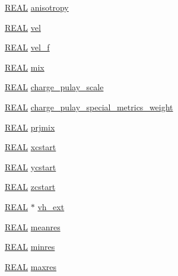 \begin{DoxyCompactItemize}
\item 
\hyperlink{md_8h_a4b654506f18b8bfd61ad2a29a7e38c25}{R\-E\-A\-L} \hyperlink{struct_c_o_n_t_r_o_l_a5503df1a9b370e7600417d31ec79512b}{anisotropy}
\item 
\hyperlink{md_8h_a4b654506f18b8bfd61ad2a29a7e38c25}{R\-E\-A\-L} \hyperlink{struct_c_o_n_t_r_o_l_a49a63336e3da84066ba9751579242e38}{vel}
\item 
\hyperlink{md_8h_a4b654506f18b8bfd61ad2a29a7e38c25}{R\-E\-A\-L} \hyperlink{struct_c_o_n_t_r_o_l_a828141a0a0d8e10c6e109f8754897de9}{vel\-\_\-f}
\item 
\hyperlink{md_8h_a4b654506f18b8bfd61ad2a29a7e38c25}{R\-E\-A\-L} \hyperlink{struct_c_o_n_t_r_o_l_a0c92233b04318ee8201e98784f481425}{mix}
\item 
\hyperlink{md_8h_a4b654506f18b8bfd61ad2a29a7e38c25}{R\-E\-A\-L} \hyperlink{struct_c_o_n_t_r_o_l_a4e38b0ac9ca32f9a7b7cf1e03c88cdc2}{charge\-\_\-pulay\-\_\-scale}
\item 
\hyperlink{md_8h_a4b654506f18b8bfd61ad2a29a7e38c25}{R\-E\-A\-L} \hyperlink{struct_c_o_n_t_r_o_l_a7bdfd343446fc6a745740d4f14929947}{charge\-\_\-pulay\-\_\-special\-\_\-metrics\-\_\-weight}
\item 
\hyperlink{md_8h_a4b654506f18b8bfd61ad2a29a7e38c25}{R\-E\-A\-L} \hyperlink{struct_c_o_n_t_r_o_l_ad61ddb92da5fd40293ea9cb0c0817470}{prjmix}
\item 
\hyperlink{md_8h_a4b654506f18b8bfd61ad2a29a7e38c25}{R\-E\-A\-L} \hyperlink{struct_c_o_n_t_r_o_l_aee8ed57388845a395074d98b7d3dded3}{xcstart}
\item 
\hyperlink{md_8h_a4b654506f18b8bfd61ad2a29a7e38c25}{R\-E\-A\-L} \hyperlink{struct_c_o_n_t_r_o_l_a43cbf2a3d20815004e16ccbd4f4be42b}{ycstart}
\item 
\hyperlink{md_8h_a4b654506f18b8bfd61ad2a29a7e38c25}{R\-E\-A\-L} \hyperlink{struct_c_o_n_t_r_o_l_a861a900beff8b536890214575b304590}{zcstart}
\item 
\hyperlink{md_8h_a4b654506f18b8bfd61ad2a29a7e38c25}{R\-E\-A\-L} $\ast$ \hyperlink{struct_c_o_n_t_r_o_l_aba2213397b38451c01fe8e0325ebecb1}{vh\-\_\-ext}
\item 
\hyperlink{md_8h_a4b654506f18b8bfd61ad2a29a7e38c25}{R\-E\-A\-L} \hyperlink{struct_c_o_n_t_r_o_l_a4a060bf96ed10f527e911c0e6df51804}{meanres}
\item 
\hyperlink{md_8h_a4b654506f18b8bfd61ad2a29a7e38c25}{R\-E\-A\-L} \hyperlink{struct_c_o_n_t_r_o_l_aea3889aaa060529f9b72a3b5febfbd58}{minres}
\item 
\hyperlink{md_8h_a4b654506f18b8bfd61ad2a29a7e38c25}{R\-E\-A\-L} \hyperlink{struct_c_o_n_t_r_o_l_a21f59867365cd3a3e36ea0eb595413bb}{maxres}

\end{DoxyCompactItemize}
